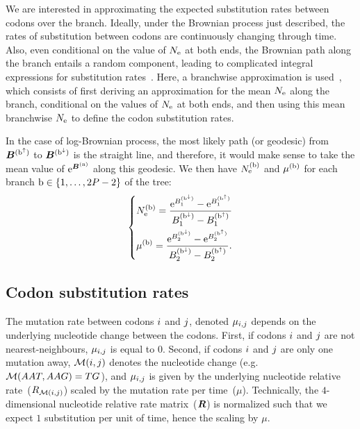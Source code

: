 \documentclass{article}
\begin{document}
    We are interested in approximating the expected substitution rates between codons over the branch.
    Ideally, under the Brownian process just described, the rates of substitution between codons are continuously changing through time.
    Also, even conditional on the value of $N_{\text{e}}$ at both ends, the Brownian path along the branch entails a random component, leading to complicated integral expressions for substitution rates~\citep{Horvilleur2014}.
    Here, a branchwise approximation is used~\citep{Lartillot2011}, which consists of first deriving an approximation for the mean $N_{\text{e}}$ along the branch, conditional on the values of $N_{\text{e}}$ at both ends, and then using this mean branchwise $N_{\text{e}}$ to define the codon substitution rates.

    In the case of log-Brownian process, the most likely path (or geodesic) from $\bm{B}^{(\text{b}^{\uparrow})}$ to $\bm{B}^{(\text{b}^{\downarrow})}$ is the straight line, and therefore, it would make sense to take the mean value of $\text{e}^{\bm{B}^{(\text{n})}}$ along this geodesic.
    We then have $N_{\text{e}}^{(\text{b})}$ and $\mu^{(\text{b})}$ for each branch $\text{b} \in \{1, \hdots, 2 P - 2\}$ of the tree:
    \begin{equation}
        \label{eq:branchNemu}
        \begin{dcases}
            N_{\text{e}}^{(\text{b})} = \dfrac{\text{e}^{B_{1}^{(\text{b}^{\downarrow})}} - \text{e}^{B_{1}^{(\text{b}^{\uparrow})}}}{B_{1}^{(\text{b}^{\downarrow})} - B_{1}^{(\text{b}^{\uparrow})}} \\
            \mu^{(\text{b})} = \dfrac{\text{e}^{B_{2}^{(\text{b}^{\downarrow})}} - \text{e}^{B_{2}^{(\text{b}^{\uparrow})}}}{B_{2}^{(\text{b}^{\downarrow})} - B_{2}^{(\text{b}^{\uparrow})}}.
        \end{dcases}
    \end{equation}

    \subsection{Codon substitution rates}

    The mutation rate between codons ${i}$ and ${j}$, denoted $\mu_{{i}, {j}}$ depends on the underlying nucleotide change between the codons.
    First, if codons ${i}$ and ${j}$ are not nearest-neighbours, $\mu_{{i}, {j}}$ is equal to $0$.
    Second, if codons ${i}$ and ${j}$ are only one mutation away, $\mathcal{M}({i}, {j})$ denotes the nucleotide change (e.g.~$\mathcal{M}(AAT, AAG) = TG$), and $\mu_{{i}, {j}}$ is given by the underlying nucleotide relative rate~(${R_{\mathcal{M}({i}, {j})}}$) scaled by the mutation rate per time~($\mu$).
    Technically, the $4$-dimensional nucleotide relative rate matrix~($\bm{R}$) is normalized such that we expect $1$ {substitution} per unit of time, hence the scaling by $\mu$.
\end{document}
